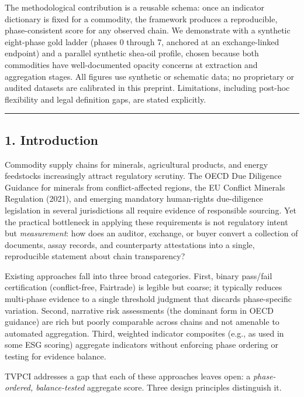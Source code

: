 \documentclass[
  11pt,
  letterpaper,
]{article}
\begin{document}
The methodological contribution is a reusable schema: once an indicator
dictionary is fixed for a commodity, the framework produces a
reproducible, phase-consistent score for any observed chain. We
demonstrate with a synthetic eight-phase gold ladder (phases 0 through
7, anchored at an exchange-linked endpoint) and a parallel synthetic
shea-oil profile, chosen because both commodities have well-documented
opacity concerns at extraction and aggregation stages. All figures use
synthetic or schematic data; no proprietary or audited datasets are
calibrated in this preprint. Limitations, including post-hoc flexibility
and legal definition gaps, are stated explicitly.

\begin{center}\rule{0.5\linewidth}{0.5pt}\end{center}

\subsection{1. Introduction}\label{introduction}

Commodity supply chains for minerals, agricultural products, and energy
feedstocks increasingly attract regulatory scrutiny. The OECD Due
Diligence Guidance for minerals from conflict-affected regions, the EU
Conflict Minerals Regulation (2021), and emerging mandatory human-rights
due-diligence legislation in several jurisdictions all require evidence
of responsible sourcing. Yet the practical bottleneck in applying these
requirements is not regulatory intent but \emph{measurement}: how does
an auditor, exchange, or buyer convert a collection of documents, assay
records, and counterparty attestations into a single, reproducible
statement about chain transparency?

Existing approaches fall into three broad categories. First, binary
pass/fail certification (conflict-free, Fairtrade) is legible but
coarse; it typically reduces multi-phase evidence to a single threshold
judgment that discards phase-specific variation. Second, narrative risk
assessments (the dominant form in OECD guidance) are rich but poorly
comparable across chains and not amenable to automated aggregation.
Third, weighted indicator composites (e.g., as used in some ESG scoring)
aggregate indicators without enforcing phase ordering or testing for
evidence balance.

TVPCI addresses a gap that each of these approaches leaves open: a
\emph{phase-ordered, balance-tested} aggregate score. Three design
principles distinguish it.
\end{document}
